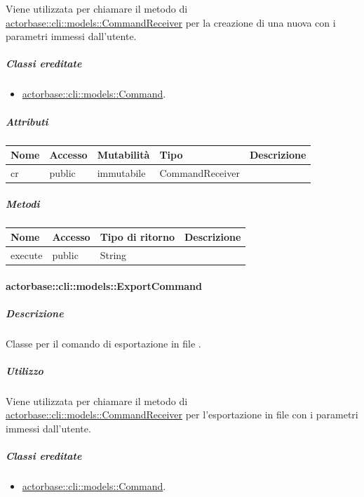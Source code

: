 \documentclass{scalatekids-article}
\begin{document}
Viene utilizzata per chiamare il metodo di
\hyperref[sec:actorbase::cli::models::CommandReceiver]{actorbase::cli::models::CommandReceiver} per la creazione di una nuova
 con i parametri immessi dall'utente.

\subparagraph{Classi ereditate}

\begin{itemize}
\item \hyperref[sec:actorbase::cli::models::Command]{actorbase::cli::models::Command}.
\end{itemize}

\subparagraph{Attributi}

\begin{tabular}{| l | l | l | l | l |}
  \hline
  Nome & Accesso & Mutabilità & Tipo & Descrizione\\
  \hline
  cr & public & immutabile & CommandReceiver & \\
  \hline
\end{tabular}

\subparagraph{Metodi}

\begin{tabular}{| l | l | l | l |}
  \hline
  Nome & Accesso & Tipo di ritorno & Descrizione\\
  \hline
  execute & public & String & \\
  \hline
\end{tabular}

\paragraph{actorbase::cli::models::ExportCommand}
\label{sec:actorbase::cli::models::ExportCommand}

\subparagraph{Descrizione}

Classe per il comando di esportazione in file .

\subparagraph{Utilizzo}

Viene utilizzata per chiamare il metodo di
\hyperref[sec:actorbase::cli::models::CommandReceiver]{actorbase::cli::models::CommandReceiver} per l'esportazione in file
 con i parametri immessi dall'utente.

\subparagraph{Classi ereditate}

\begin{itemize}
\item \hyperref[sec:actorbase::cli::models::Command]{actorbase::cli::models::Command}.
\end{itemize}
\end{document}
